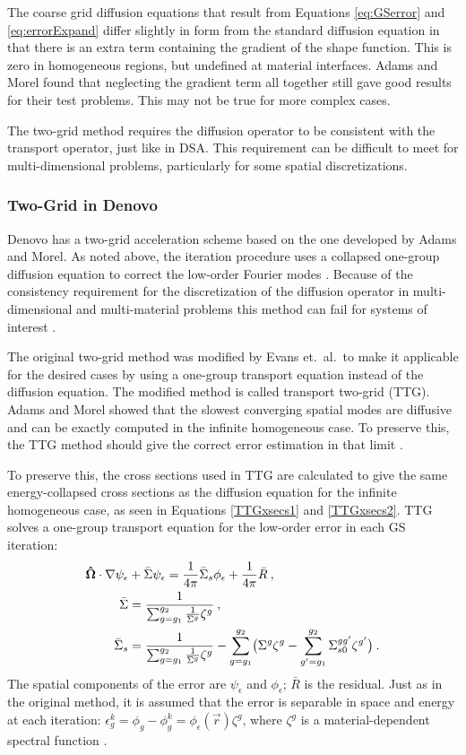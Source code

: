 The coarse grid diffusion equations that result from Equations \eqref{eq:GSerror} and \eqref{eq:errorExpand} differ slightly in form from the standard diffusion equation in that there is an extra term containing the gradient of the shape function. This is zero in homogeneous regions, but undefined at material interfaces. Adams and Morel found that neglecting the gradient term all together still gave good results for their test problems. This may not be true for more complex cases.

The two-grid method requires the diffusion operator to be consistent with the transport operator, just like in DSA. This requirement can be difficult to meet for multi-dimensional problems, particularly for some spatial discretizations. 

\subsubsection{Two-Grid in Denovo}
\label{sec:TTG}
Denovo has a two-grid acceleration scheme based on the one developed by Adams and Morel. As noted above, the iteration procedure uses a collapsed one-group diffusion equation to correct the low-order Fourier modes \cite{Adams1993}. Because of the consistency requirement for the discretization of the diffusion operator in multi-dimensional and multi-material problems this method can fail for systems of interest \cite{Evans2009d}. 

The original two-grid method was modified by Evans et.\ al.\ to make it applicable for the desired cases by using a one-group transport equation instead of the diffusion equation. The modified method is called transport two-grid (TTG). Adams and Morel showed that the slowest converging spatial modes are diffusive and can be exactly computed in the infinite homogeneous case. To preserve this, the TTG method should give the correct error estimation in that limit \cite{Evans2009d}. 

To preserve this, the cross sections used in TTG are calculated to give the same energy-collapsed cross sections as the diffusion equation for the infinite homogeneous case, as seen in Equations \eqref{TTGxsecs1} and \eqref{TTGxsecs2}. TTG solves a one-group transport equation for the low-order error in each GS iteration:
%
\begin{align}
  \mathbf{\hat{\Omega}} \cdot \nabla \psi_{\epsilon} &+ \bar{\Sigma}\psi_{\epsilon} = \frac{1}{4\pi}\bar{\Sigma}_{s}\phi_{\epsilon} + \frac{1}{4\pi}\bar{R} \:, \\
  \bar{\Sigma} &= \frac{1}{\sum_{g=g_1}^{g_2} \frac{1}{\Sigma^g}\zeta^g} \label{TTGxsecs1} \:,\\
  \bar{\Sigma}_{s} &= \frac{1}{\sum_{g=g_1}^{g_2} \frac{1}{\Sigma^g}\zeta^g} - \sum_{g=g_1}^{g_2} \bigl(\Sigma^g\zeta^g - \sum_{g'=g_1}^{g_2} \Sigma_{s0}^{gg'} \zeta^{g'} \bigr) \label{TTGxsecs2} \:. 
\end{align}
%
The spatial components of the error are $\psi_{\epsilon}$ and $\phi_{\epsilon}$; $\bar{R}$ is the residual. Just as in the original method, it is assumed that the error is separable in space and energy at each iteration: $\epsilon_g^k = \phi_g - \phi_g^k = \phi_{\epsilon}(\vec{r})\zeta^g$, where $\zeta^g$ is a material-dependent spectral function \cite{Evans2009d}. 

